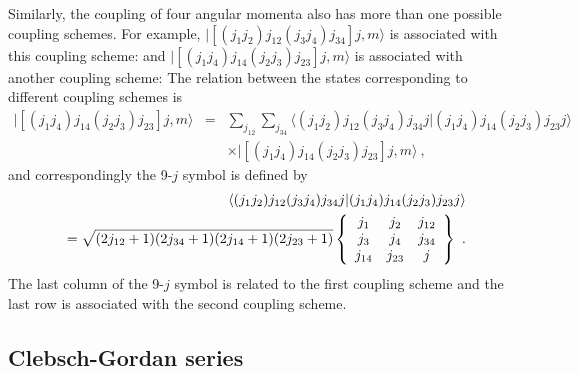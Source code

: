 Similarly, the coupling of four angular momenta also has more than one possible coupling schemes. For example, 
  $|\left[(j_{1}j_{2})j_{12}(j_{3}j_{4})j_{34}\right] j, m \rangle$ is associated with this coupling scheme:
and  $|\left[(j_{1}j_{4})j_{14}(j_{2}j_{3})j_{23}\right] j, m \rangle$ is associated with another coupling scheme:
The relation between the states corresponding to different
coupling schemes is
\begin{eqnarray}
|\left[(j_{1}j_{4})j_{14}(j_{2}j_{3})j_{23}\right] j, m \rangle &=& \sum_{j_{12}}\sum_{j_{34}} \langle (j_{1}j_{2})j_{12}(j_{3}j_{4})j_{34}j  | (j_{1}j_{4})j_{14}(j_{2}j_{3})j_{23}j \rangle \nonumber \\
& & \times |\left[ (j_{1}j_{4})j_{14}(j_{2}j_{3})j_{23}\right] j, m \rangle \ , \label{9-j1}
\end{eqnarray}
and correspondingly the 9-$j$ symbol is defined by
\begin{eqnarray}
&&\langle  (j_{1}j_{2})j_{12}(j_{3}j_{4})j_{34}j  | (j_{1}j_{4})j_{14}(j_{2}j_{3})j_{23}j  \rangle \nonumber \\
& & = \sqrt{(2j_{12} + 1) (2j_{34} +1)(2j_{14}+1)(2j_{23} + 1)}
\left\{
\begin{array}{ccc}
j_{1}& j_{2}&j_{12} \\
j_{3}&j_{4}&j_{34} \\
j_{14}&j_{23}&j 
\end{array}
\right\} \ . \label{9-j2}
\end{eqnarray}
The last column of the 9-$j$ symbol is related to the first coupling scheme and the last row is 
associated with the second coupling scheme.

\subsection{Clebsch-Gordan series}

